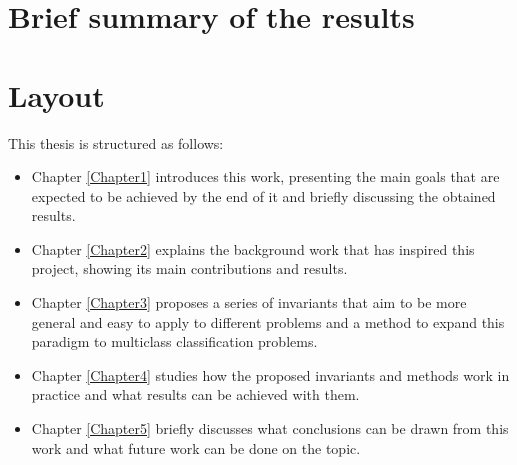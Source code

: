 \section{Brief summary of the results}



\section{Layout}

This thesis is structured as follows:

\begin{itemize}
    \item Chapter \ref{Chapter1} introduces this work, presenting the main goals that are expected
    to be achieved by the end of it and briefly discussing the obtained results.
    \item Chapter \ref{Chapter2} explains the background work that has inspired this project,
    showing its main contributions and results.
    \item Chapter \ref{Chapter3} proposes a series of invariants that aim to be more general and easy
    to apply to different problems and a method to expand this paradigm to multiclass classification
    problems.
    \item Chapter \ref{Chapter4} studies how the proposed invariants and methods work in practice
    and what results can be achieved with them.
    \item Chapter \ref{Chapter5} briefly discusses what conclusions can be drawn from this work
    and what future work can be done on the topic.
\end{itemize}

